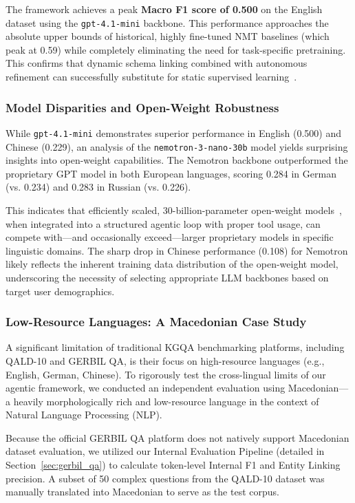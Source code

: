 The framework achieves a peak \textbf{Macro F1 score of 0.500} on the English dataset using the \texttt{gpt-4.1-mini} backbone. This performance approaches the absolute upper bounds of historical, highly fine-tuned NMT baselines (which peak at 0.59) while completely eliminating the need for task-specific pretraining. This confirms that dynamic schema linking combined with autonomous refinement can successfully substitute for static supervised learning~\cite{dabramo_investigating_2025}.

\subsubsection{Model Disparities and Open-Weight Robustness}
While \texttt{gpt-4.1-mini} demonstrates superior performance in English (0.500) and Chinese (0.229), an analysis of the \texttt{nemotron-3-nano-30b} model yields surprising insights into open-weight capabilities. The Nemotron backbone outperformed the proprietary GPT model in both European languages, scoring 0.284 in German (vs. 0.234) and 0.283 in Russian (vs. 0.226). 

This indicates that efficiently scaled, 30-billion-parameter open-weight models~\cite{brei_leveraging_2024}, when integrated into a structured agentic loop with proper tool usage, can compete with—and occasionally exceed—larger proprietary models in specific linguistic domains. The sharp drop in Chinese performance (0.108) for Nemotron likely reflects the inherent training data distribution of the open-weight model, underscoring the necessity of selecting appropriate LLM backbones based on target user demographics.
\subsubsection{Low-Resource Languages: A Macedonian Case Study}
\label{sec:macedonian_case_study}

A significant limitation of traditional KGQA benchmarking platforms, including QALD-10 and GERBIL QA, is their focus on high-resource languages (e.g., English, German, Chinese). To rigorously test the cross-lingual limits of our agentic framework, we conducted an independent evaluation using Macedonian—a heavily morphologically rich and low-resource language in the context of Natural Language Processing (NLP).

Because the official GERBIL QA platform does not natively support Macedonian dataset evaluation, we utilized our Internal Evaluation Pipeline (detailed in Section~\ref{sec:gerbil_qa}) to calculate token-level Internal F1 and Entity Linking precision. A subset of 50 complex questions from the QALD-10 dataset was manually translated into Macedonian to serve as the test corpus.

